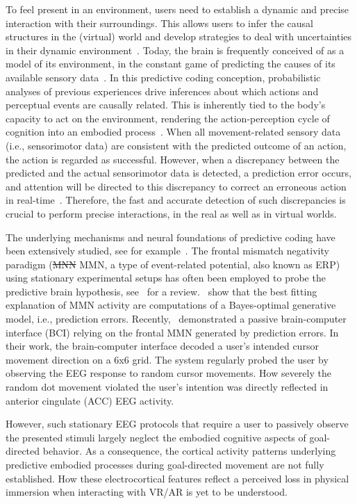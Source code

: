 To feel present in an environment, users need to establish a dynamic and precise interaction with their surroundings. This allows users to infer the causal structures in the (virtual) world and develop strategies to deal with uncertainties in their dynamic environment~\cite{Knill2004-sz}. Today, the brain is frequently conceived of as a model of its environment, in the constant game of predicting the causes of its available sensory data~\cite{Clark2013-ah, Friston2010-hy, Rao1999-zr}. In this predictive coding conception, probabilistic analyses of previous experiences drive inferences about which actions and perceptual events are causally related. This is inherently tied to the body’s capacity to act on the environment, rendering the action-perception cycle of cognition into an embodied process~\cite{Friston2012-gq}. When all movement-related sensory data (i.e., sensorimotor data) are consistent with the predicted outcome of an action, the action is regarded as successful. However, when a discrepancy between the predicted and the actual sensorimotor data is detected, a prediction error occurs, and attention will be directed to this discrepancy to correct an erroneous action in real-time~\cite{Savoie2018-ad}. Therefore, the fast and accurate detection of such discrepancies is crucial to perform precise interactions, in the real as well as in virtual worlds.

The underlying mechanisms and neural foundations of predictive coding have been extensively studied, see for example~\cite{Holroyd2002-in, Clark2013-ah, Bendixen2012-jx}. The frontal mismatch negativity paradigm (\st{MNN} \textcolor{n}{MMN}, a type of event-related potential, also known as ERP) using stationary experimental setups has often been employed to probe the predictive brain hypothesis, see~\cite{Stefanics2014-vk} for a review.~\cite{Lieder2013-dl} show that the best fitting explanation of MMN activity are computations of a Bayes-optimal generative model, i.e., prediction errors. Recently,~\cite{Zander2016-ed} demonstrated a passive brain-computer interface \textcolor{n}{(BCI)} relying on \textcolor{n}{the} frontal MMN generated by prediction errors. In their work, the brain-computer interface decoded a user's intended cursor movement direction on a 6x6 grid. The system regularly probed the user by observing the EEG response to random cursor movements. How severely the random dot movement violated the user's intention was directly reflected in anterior cingulate (ACC) EEG activity. 

However, such stationary EEG protocols \textcolor{n}{that require a user to passively observe the presented stimuli} largely neglect the embodied cognitive aspects of goal-directed behavior. As a consequence, the cortical activity patterns underlying predictive embodied processes during goal-directed movement are not fully established. How these electrocortical features reflect a perceived loss in physical immersion when interacting with VR/AR is yet to be understood. 

